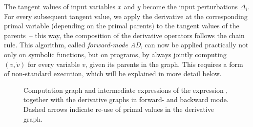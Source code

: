 The tangent values of input variables \(x\) and \(y\) become the input perturbations \(\Delta_i\).
For every subsequent tangent value, we apply the derivative at the corresponding primal variable
(depending on the primal parents) to the tangent values of the parents~-- this way, the composition
of the derivative operators follows the chain rule.  This algorithm, called \emph{forward-mode AD},
can now be applied practically not only on symbolic functions, but on programs, by always jointly
computing \((v, \dot{v})\) for every variable \(v\), given its parents in the graph.  This requires
a form of non-standard execution, which will be explained in more detail below.

\begin{figure}[t]
  \centering
  \qquad
  \caption{Computation graph and intermediate expressions of the expression \protect{}, together with the derivative graphs in forward- and backward mode.  Dashed arrows
    indicate re-use of primal values in the derivative graph.}
  \label{fig:comp-graph}
\end{figure}

